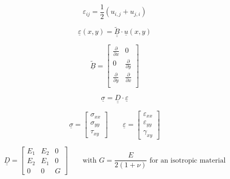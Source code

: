 \documentclass[a4paper]{jpconf}
\begin{document}
\begin{equation}
\varepsilon_{ij}=\frac{1}{2}\left(u_{i,j}+u_{j,i}\right)
\end{equation}

\begin{equation}
\underline{\varepsilon}\left(x,y\right)=\underline{\underline{\widetilde{B}}}\cdot\underline{u}\left(x,y\right)
\end{equation}

\begin{equation}
\underline{\widetilde{B}}=\begin{bmatrix}
\frac{\partial }{\partial x}&0\\[7.5pt]
0&\frac{\partial }{\partial y}\\[7.5pt]
\frac{\partial }{\partial y}&\frac{\partial }{\partial x}\\
\end{bmatrix}
\end{equation}


\begin{equation}
\underline{\sigma}=\underline{\underline{D}}\cdot\underline{\varepsilon}
\end{equation}

\begin{equation}
\underline{\sigma}=\begin{bmatrix}
\sigma_{xx}\\\sigma_{yy}\\\tau_{xy}
\end{bmatrix}\qquad\underline{\varepsilon}=\begin{bmatrix}
\varepsilon_{xx}\\\varepsilon_{yy}\\\gamma_{xy}
\end{bmatrix}
\end{equation}

\begin{equation}
\underline{\underline{D}}=\begin{bmatrix}
E_{1}&E_{2}&0\\E_{2}&E_{1}&0\\0&0&G
\end{bmatrix}\qquad\text{with }G=\frac{E}{2\left(1+\nu\right)}\text{ for an isotropic material}
\end{equation}
\end{document}

